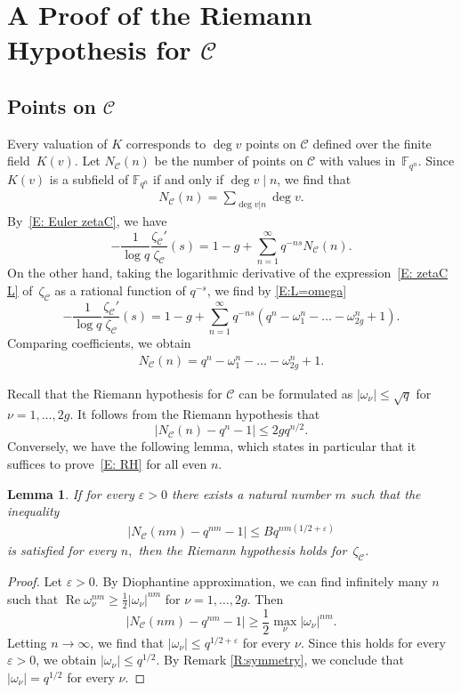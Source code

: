 \documentclass{amsart}
\renewcommand\Re{\operatorname*{Re}}	\renewcommand\Im{\operatorname*{Im}}
\newcommand\F{\mathbb{F}}
\newcommand\Curve{\mathcal{C}}
\newtheorem{lemma}[theorem]{Lemma}
\theoremstyle{definition}\newtheorem{definition}[theorem]{Definition}
\theoremstyle{remark}\newtheorem{remark}[theorem]{Remark}
\numberwithin{equation}{section}
\begin{document}
\section{A Proof of the Riemann Hypothesis for $\Curve$}
\label{S:RH}

\subsection{Points on $\Curve$}
\label{S:points}

Every valuation of $K$ corresponds to $\deg v$ points on $\Curve$ defined over the finite field~$K(v)$.
Let $N_\Curve(n)$ be the number of points on $\Curve$ with values in~$\F_{q^n}$.
Since $K(v)$ is a subfield of $\F_{q^n}$ if and only if $\deg v\mid n$,
we find that
\begin{gather}\label{E:N_C}
N_\Curve(n)=\sum_{\deg v|n}\deg v.
\end{gather}
By~\eqref{E: Euler zetaC},
we have
$$
-\frac1{\log q}\frac{\zeta_\Curve'}{\zeta_\Curve}(s)
=1-g+\sum_{n=1}^\infty q^{-ns}N_\Curve(n).
$$
On the other hand,
taking the logarithmic derivative of the expression~\eqref{E: zetaC L} of~$\zeta_\Curve$ as a rational function of $q^{-s}$,
we find by \eqref{E:L=omega}
$$
-\frac1{\log q}\frac{\zeta_\Curve'}{\zeta_\Curve}(s)
=1-g+\sum_{n=1}^\infty q^{-ns}\left(q^n-\omega_1^n-\dots-\omega_{2g}^n+1\right).
$$
Comparing coefficients,
we obtain
\begin{gather}\label{E:NCn}
N_\Curve(n)=q^n-\omega_1^n-\dots-\omega_{2g}^n+1.
\end{gather}

Recall that the Riemann hypothesis for $\Curve$ can be formulated as $|\omega_\nu|\leq\sqrt q$ for $\nu=1,\dots,2g$.
It follows from the Riemann hypothesis that
$$
\left|N_\Curve(n)-q^n-1\right|\leq2gq^{n/2}.
$$
Conversely,
we have the following lemma,
which states in particular that it suffices to prove~\eqref{E: RH} for all even $n$.

\begin{lemma}\label{L: RH}
If for every $\varepsilon>0$ there exists a natural number\/ $m$ such that the inequality
\begin{gather}\label{E: RH}
\left|N_\Curve(nm)-q^{nm}-1\right|\leq Bq^{nm(1/2+\varepsilon)}
\end{gather}
is satisfied for every\/ $n,$
then the Riemann hypothesis holds for\/~$\zeta_\Curve$.
\end{lemma}

\begin{proof}
Let $\varepsilon>0$.
By Diophantine approximation,
we can find infinitely many $n$ such that $\Re\omega_\nu^{nm}\geq\frac12|\omega_\nu|^{nm}$ for $\nu=1,\dots,2g$.
Then
$$
\left|N_\Curve(nm)-q^{nm}-1\right|\geq\frac12\max_\nu|\omega_\nu|^{nm}.
$$
Letting $n\to\infty$,
we find that $|\omega_\nu|\leq q^{1/2+\varepsilon}$ for every $\nu$.
Since this holds for every $\varepsilon>0$,
we obtain $|\omega_\nu|\leq q^{1/2}$.
By Remark \ref{R:symmetry},
we conclude that $|\omega_\nu|=q^{1/2}$ for every $\nu$.
\end{proof}
\end{document}
